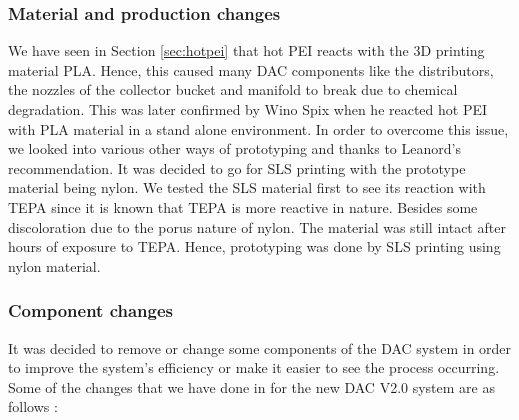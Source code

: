 \subsubsection{Material and production changes}

We have seen in Section \ref{sec:hotpei} that hot PEI reacts with the 3D printing material PLA. Hence, this caused many DAC components like the distributors, the nozzles of the collector bucket and manifold to break due to chemical degradation. This was later confirmed by Wino Spix when he reacted hot PEI with PLA material in a stand alone environment. In order to overcome this issue, we looked into various other ways of prototyping and thanks to Leanord's recommendation. It was decided to go for SLS printing with the prototype material being nylon. We tested the SLS material first to see its reaction with TEPA since it is known that TEPA is more reactive in nature. Besides some discoloration due to the porus nature of nylon. The material was still intact after hours of exposure to TEPA. Hence, prototyping was done by SLS printing using nylon material.    


\subsubsection{Component changes}

It was decided to remove or change some components of the DAC system in order to improve the system's efficiency or make it easier to see the process occurring. Some of the changes that we have done in for the new DAC V2.0 system are as follows : 

